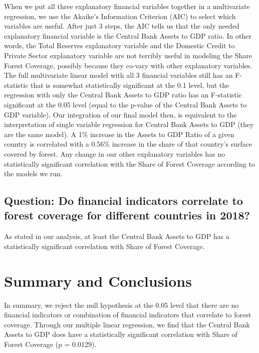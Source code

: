 \documentclass[
  12pt,
]{article}
\begin{document}
When we put all three explanatory financial variables together in a
multivariate regression, we use the Akaike's Information Criterion (AIC)
to select which variables are useful. After just 3 steps, the AIC tells
us that the only needed explanatory financial variable is the Central
Bank Assets to GDP ratio. In other words, the Total Reserves explanatory
variable and the Domestic Credit to Private Sector explanatory variable
are not terribly useful in modeling the Share Forest Coverage, possibly
because they co-vary with other explanatory variables. The full
multivariate linear model with all 3 financial variables still has an
F-statistic that is somewhat statistically significant at the 0.1 level,
but the regression with only the Central Bank Assets to GDP ratio has an
F-statistic significant at the 0.05 level (equal to the p-value of the
Central Bank Assets to GDP variable). Our integration of our final model
then, is equivalent to the interpretation of single variable regression
for Central Bank Assets to GDP (they are the same model). A 1\% increase
in the Assets to GDP Ratio of a given country is correlated with a
0.56\% increase in the share of that country's surface covered by
forest. Any change in our other explanatory variables has no
statistically significant correlation with the Share of Forest Coverage
according to the models we run.

\hypertarget{question-do-financial-indicators-correlate-to-forest-coverage-for-different-countries-in-2018}{%
\subsection{Question: Do financial indicators correlate to forest
coverage for different countries in
2018?}\label{question-do-financial-indicators-correlate-to-forest-coverage-for-different-countries-in-2018}}

As stated in our analysis, at least the Central Bank Assets to GDP has a
statistically significant correlation with Share of Forest Coverage.

\newpage

\hypertarget{summary-and-conclusions}{%
\section{Summary and Conclusions}\label{summary-and-conclusions}}

In summary, we reject the null hypothesis at the 0.05 level that there
are no financial indicators or combination of financial indicators that
correlate to forest coverage. Through our multiple linear regression, we
find that the Central Bank Assets to GDP does have a statistically
significant correlation with Share of Forest Coverage (p = 0.0129).
\end{document}
